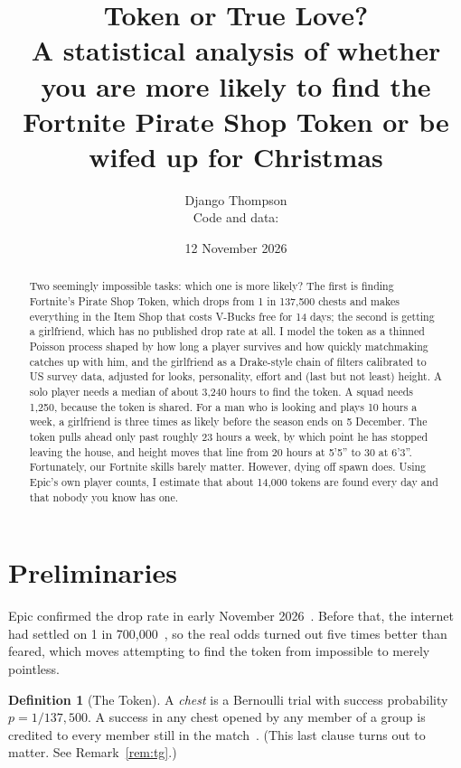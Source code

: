 \documentclass[11pt]{article}
\title{\textbf{Token or True Love?}\\[4pt] \large A statistical analysis of whether you are more likely to find the Fortnite Pirate Shop Token or be wifed up for Christmas}
\author{Django Thompson\\[2pt] \small Code and data: \texttt{\repourl}}
\date{12 November 2026}
\theoremstyle{definition}
\newtheorem{definition}{Definition}[section]
\theoremstyle{plain}
\begin{document}
\maketitle

\begin{abstract}
\noindent
Two seemingly impossible tasks: which one is more likely? The first is finding Fortnite's Pirate Shop Token, which drops from 1 in 137{,}500 chests and makes everything in the Item Shop that costs V-Bucks free for 14 days; the second is getting a girlfriend, which has no published drop rate at all. I model the token as a thinned Poisson process shaped by how long a player survives and how quickly matchmaking catches up with him, and the girlfriend as a Drake-style chain of filters calibrated to US survey data, adjusted for looks, personality, effort and (last but not least) height. A solo player needs a median of about 3{,}240 hours to find the token. A squad needs 1{,}250, because the token is shared. For a man who is looking and plays 10 hours a week, a girlfriend is three times as likely before the season ends on 5 December. The token pulls ahead only past roughly 23 hours a week, by which point he has stopped leaving the house, and height moves that line from 20 hours at 5'5'' to 30 at 6'3''. Fortunately, our Fortnite skills barely matter. However, dying off spawn does. Using Epic's own player counts, I estimate that about 14{,}000 tokens are found every day and that nobody you know has one.
\end{abstract}


\section{Preliminaries}

Epic confirmed the drop rate in early November 2026~\cite{status,vgc}. Before that, the internet had settled on 1 in 700{,}000~\cite{timesaver}, so the real odds turned out five times better than feared, which moves attempting to find the token from impossible to merely pointless.

\begin{definition}[The Token]
A \emph{chest} is a Bernoulli trial with success probability $p = 1/137{,}500$. A success in any chest opened by any member of a group is credited to every member still in the match~\cite{gamesradar}. (This last clause turns out to matter. See Remark~\ref{rem:tg}.)
\end{definition}
\end{document}
